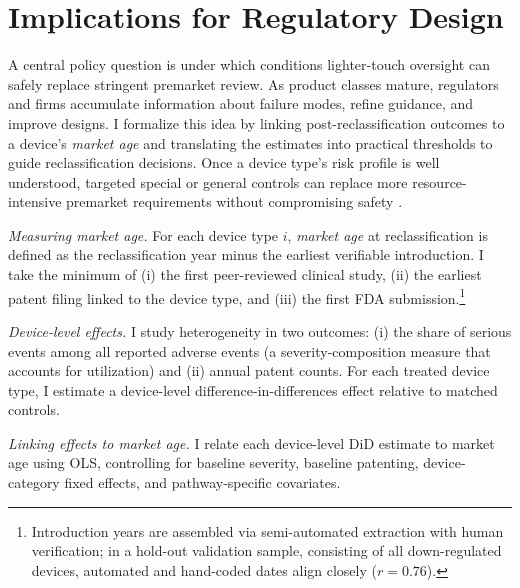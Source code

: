 \documentclass[letterpaper,12pt]{article}
\theoremstyle{definition}
\begin{document}
\section{Implications for Regulatory Design}\label{sec:RegulatoryDesign}

A central policy question is under which conditions lighter-touch oversight can safely replace stringent premarket review. As product classes mature, regulators and firms accumulate information about failure modes, refine guidance, and improve designs. I formalize this idea by linking post-reclassification outcomes to a device’s \emph{market age} and translating the estimates into practical thresholds to guide reclassification decisions. Once a device type’s risk profile is well understood, targeted special or general controls can replace more resource-intensive premarket requirements without compromising safety \citep{baldwin2011understanding,coglianese2003management,viscusi2018economics}.

\textit{Measuring market age.} For each device type $i$, \emph{market age} at reclassification is defined as the reclassification year minus the earliest verifiable introduction. I take the minimum of (i) the first peer-reviewed clinical study, (ii) the earliest patent filing linked to the device type, and (iii) the first FDA submission.\footnote{Introduction years are assembled via semi-automated extraction with human verification; in a hold-out validation sample, consisting of all down-regulated devices, automated and hand-coded dates align closely ($r=0.76$).}



\textit{Device-level effects.} I study heterogeneity in two outcomes: (i) the share of serious events among all reported adverse events (a severity-composition measure that accounts for utilization) and (ii) annual patent counts. For each treated device type, I estimate a device-level difference-in-differences effect relative to matched controls.\footnotemark {}


\textit{Linking effects to market age.} I relate each device-level DiD estimate to market age using OLS, controlling for baseline severity, baseline patenting, device-category fixed effects, and pathway-specific covariates.\footnotemark {}
\end{document}
